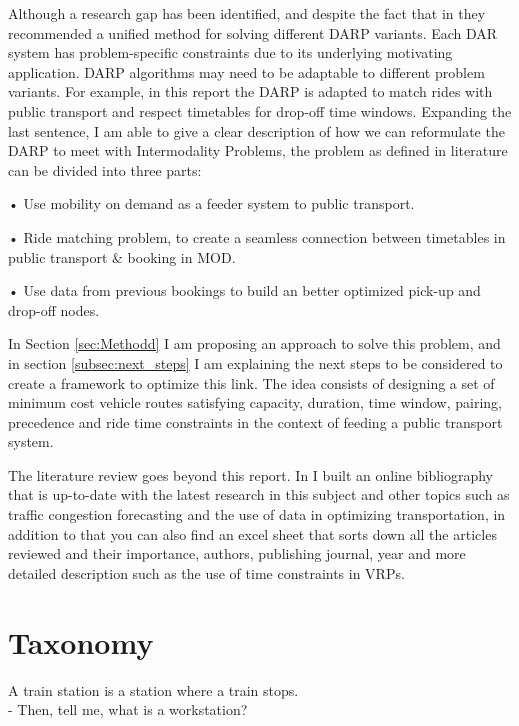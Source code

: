 \documentclass{article}
\begin{document}
Although a research gap has been identified, and despite the fact that in \cite{HO_darp2018} they recommended a unified method for solving different DARP variants. 
Each DAR system has problem-specific constraints due to its underlying motivating application. DARP algorithms may need to be adaptable to different problem variants. For example, in this report the DARP is adapted to match rides with public transport and 
respect timetables for drop-off time windows.
\label{subsec:reformulate_problem}
Expanding the last sentence, I am able to give a clear description of how we can reformulate the DARP to meet with Intermodality Problems, the problem as defined in literature can be divided into three parts:
\begin{list}{}
\item • Use mobility on demand as a feeder system to public transport.
\item • Ride matching problem, to create a seamless connection between timetables in public transport \& booking in MOD.
\item • Use data from previous bookings to build an better optimized pick-up and drop-off nodes.
\end{list}

In Section \ref{sec:Methodd} I am proposing an approach to solve this problem, and in section \ref{subsec:next_steps} I am explaining the next steps to be considered to create a framework to optimize this link. The idea consists of designing a set of minimum cost vehicle routes satisfying capacity, duration, time window, pairing, precedence and ride time constraints in the context of feeding a public transport system.


The literature review goes beyond this report. In \cite{my_bibliography} I built an online bibliography that is up-to-date with the latest research in this subject and other topics such as traffic congestion forecasting and the use of data in optimizing transportation, in addition to that you can also find an excel sheet that sorts down all the articles reviewed and their importance, authors, publishing journal, year and more detailed description such as the use of time constraints in VRPs.


\section{Taxonomy}
\label{sec:taxonomy}

\begin{flushright}
A train station is a station where a train stops.\\
- Then, tell me, what is a workstation?
\end{flushright}
\end{document}
